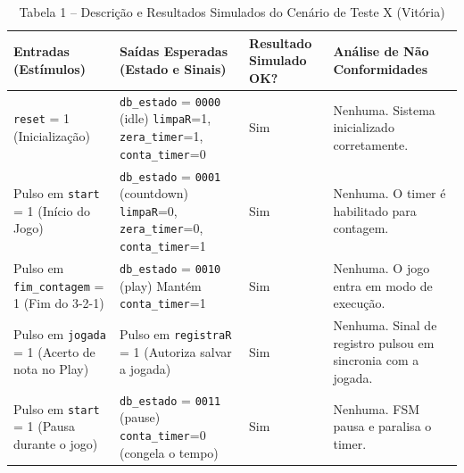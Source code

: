 \documentclass[a4paper,12pt,twoside]{article}
\begin{document}
  \begin{table}[H]
  \centering
  \caption{Tabela 1 -- Descrição e Resultados Simulados do Cenário de Teste X (Vitória)}
  \begin{tabular}{|>{\centering\arraybackslash}p{}|>{\centering\arraybackslash}p{}
  |>{\centering\arraybackslash}p{}|>{\centering\arraybackslash}p{}|}
  \hline
  \textbf{Entradas (Estímulos)} & \textbf{Saídas Esperadas (Estado e Sinais)} & \textbf{Resultado Simulado
  OK?} & \textbf{Análise de Não Conformidades} \\ \hline


  \texttt{reset} = 1 \newline (Inicialização) &
  \texttt{db\_estado} = \texttt{0000} (idle) \newline \texttt{limpaR}=1, \texttt{zera\_timer}=1,
  \texttt{conta\_timer}=0 &
  Sim &
  Nenhuma. Sistema inicializado corretamente. \\ \hline


  Pulso em \texttt{start} = 1 \newline (Início do Jogo) &
  \texttt{db\_estado} = \texttt{0001} (countdown) \newline \texttt{limpaR}=0, \texttt{zera\_timer}=0,
  \texttt{conta\_timer}=1 &
  Sim &
  Nenhuma. O timer é habilitado para contagem. \\ \hline


  Pulso em \texttt{fim\_contagem} = 1 \newline (Fim do 3-2-1) &
  \texttt{db\_estado} = \texttt{0010} (play) \newline Mantém \texttt{conta\_timer}=1 &
  Sim &
  Nenhuma. O jogo entra em modo de execução. \\ \hline


  Pulso em \texttt{jogada} = 1 \newline (Acerto de nota no Play) &
  Pulso em \texttt{registraR} = 1 \newline (Autoriza salvar a jogada) &
  Sim &
  Nenhuma. Sinal de registro pulsou em sincronia com a jogada. \\ \hline


  Pulso em \texttt{start} = 1 \newline (Pausa durante o jogo) &
  \texttt{db\_estado} = \texttt{0011} (pause) \newline \texttt{conta\_timer}=0 (congela o tempo) &
  Sim &
  Nenhuma. FSM pausa e paralisa o timer. \\ \hline



\end{tabular}
\end{table}
\end{document}
